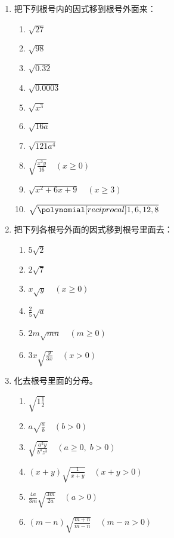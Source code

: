 \begin{ex}
\begin{enumerate}
    \item  把下列根号内的因式移到根号外面来：      
    \begin{multicols}{2}\begin{enumerate}
        \item $\sqrt{27}$
    \item $\sqrt{98}$
    \item $\sqrt{0.32}$
    \item $\sqrt{0.0003}$
    \item $\sqrt{x^3}$
    \item $\sqrt{16a}$
    \item $\sqrt{121a^4}$
    \item $\sqrt{\frac{x^2y}{16}}\quad (x\ge 0)$   
    \item $\sqrt{x^2+6x+9}\quad (x\ge 3)$
    \item $\sqrt{\poly{1,6,12,8}}$
\end{enumerate}    \end{multicols}
 
\item 把下列各根号外面的因式移到根号里面去：
\begin{multicols}{2}
    \begin{enumerate}
    \item $5\sqrt{2}$
    \item $2\sqrt{7}$
    \item $x\sqrt{y}\quad (x\ge 0)$
    \item $\frac{2}{5}\sqrt{a}$
    \item $2m\sqrt{mn}\quad (m\ge 0)$
    \item $3x\sqrt{\frac{y}{3x}}\quad (x>0)$
\end{enumerate}
\end{multicols}

\item 化去根号里面的分母。
\begin{enumerate}
    \item $\sqrt{1\frac{1}{2}}$
    \item $a\sqrt{\frac{a}{b}}\quad (b>0)$
    \item $\sqrt{\frac{a^3y}{b^4z^3}}\quad (a\ge 0,\; b>0)$
    \item $(x+y)\sqrt{\frac{1}{x+y}}\quad (x+y>0)$
    \item $\frac{4a}{3m}\sqrt{\frac{3m}{2a}}\quad (a>0)$
    \item $(m-n)\sqrt{\frac{m+n}{m-n}}\quad (m-n>0)$
\end{enumerate}
\end{enumerate}   
\end{ex}

